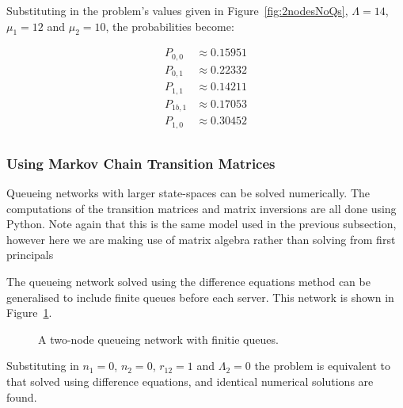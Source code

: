 \documentclass{article}
\begin{document}
Substituting in the problem's values given in Figure~\ref{fig:2nodesNoQs}, $\Lambda = 14$, $\mu_1 = 12$ and $\mu_2 = 10$, the probabilities become:

\begin{align*}
    P_{0,0} &\approx 0.15951\\
    P_{0,1} &\approx 0.22332\\
    P_{1,1} &\approx 0.14211\\
    P_{1b,1} &\approx 0.17053\\
    P_{1,0} &\approx 0.30452\\
\end{align*}


\subsubsection{Using Markov Chain Transition Matrices}

Queueing networks with larger state-spaces can be solved numerically.
The computations of the transition matrices and matrix inversions are all done using Python.
Note again that this is the same model used in the previous subsection, however here we are making use of matrix algebra rather than solving from first principals

The queueing network solved using the difference equations method can be generalised to include finite queues before each server.
This network is shown in Figure~\ref{fig:2nodesQs}.

\begin{figure}[H]
    
    \caption{A two-node queueing network with finitie queues.}
    \label{fig:2nodesQs}
\end{figure}

Substituting in $n_1 = 0$, $n_2 = 0$, $r_{12} = 1$ and $\Lambda_2 = 0$ the problem is equivalent to that solved using difference equations, and identical numerical solutions are found.
\end{document}
